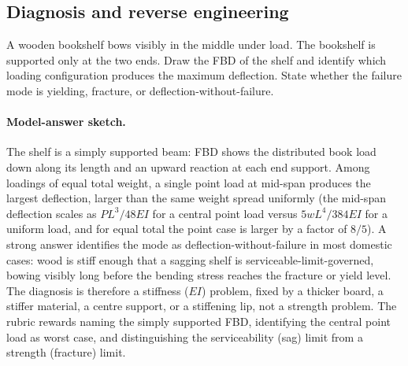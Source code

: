 \subsection*{Diagnosis and reverse engineering}

\begin{exercise}
A wooden bookshelf bows visibly in the middle under load. The
bookshelf is supported only at the two ends. Draw the FBD of the
shelf and identify which loading configuration produces the maximum
deflection. State whether the failure mode is yielding, fracture, or
deflection-without-failure.
\paragraph{Model-answer sketch.} The shelf is a simply supported beam:
FBD shows the distributed book load down along its length and an upward
reaction at each end support. Among loadings of equal total weight, a
single point load at mid-span produces the largest deflection, larger
than the same weight spread uniformly (the mid-span deflection scales as
$PL^3/48EI$ for a central point load versus $5wL^4/384EI$ for a uniform
load, and for equal total the point case is larger by a factor of
$8/5$). A strong answer identifies the mode as deflection-without-failure
in most domestic cases: wood is stiff enough that a sagging shelf is
serviceable-limit-governed, bowing visibly long before the bending
stress reaches the fracture or yield level. The diagnosis is therefore a
stiffness ($EI$) problem, fixed by a thicker board, a stiffer material,
a centre support, or a stiffening lip, not a strength problem. The
rubric rewards naming the simply supported FBD, identifying the central
point load as worst case, and distinguishing the serviceability (sag)
limit from a strength (fracture) limit.
\end{exercise}

